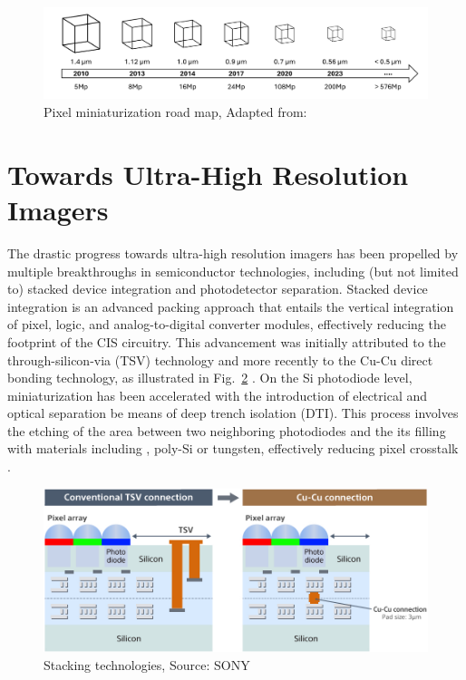 \begin{figure}
  \centering
  \medskip
  \includegraphics[width=.99\textwidth]{chapters/introduction/image/pixel_miniaturization.pdf}
  \caption[Short caption for Table of Figures]{Pixel miniaturization road map, Adapted from: \cite{SookyoungRoh2025Dispersion-engineeredSensors}}
  \label{fig:ch1:pixel_size}
\end{figure}

\section{Towards Ultra-High Resolution Imagers}

The drastic progress towards ultra-high resolution imagers has been propelled by multiple breakthroughs in semiconductor technologies, including (but not limited to) stacked device integration and photodetector separation. Stacked device integration is an advanced packing approach that entails the vertical integration of pixel, logic, and analog-to-digital converter modules, effectively reducing the footprint of the CIS circuitry. This advancement was initially attributed to the through-silicon-via (TSV) technology and more recently to the Cu-Cu direct bonding technology, as illustrated in Fig.~\ref{fig:ch1:stacking_technologies} \cite{Kagawa20193DSensors}. On the Si photodiode level, miniaturization has been accelerated with the introduction of electrical and optical separation be means of deep trench isolation (DTI). This process involves the etching of the area between two neighboring photodiodes and the its filling with materials including , poly-Si or tungsten, effectively reducing pixel crosstalk \cite{Ahn2014AGate, Okawa2019ALevel, Kim2020ATechnology, Park20217.9Isolation}.   

\begin{figure}
  \centering
  \medskip
  \includegraphics[width=.8\textwidth]{chapters/introduction/image/stacking.jpg}
  \caption[Short caption for Table of Figures]{Stacking technologies, Source: SONY}
  \label{fig:ch1:stacking_technologies} 
\end{figure}




